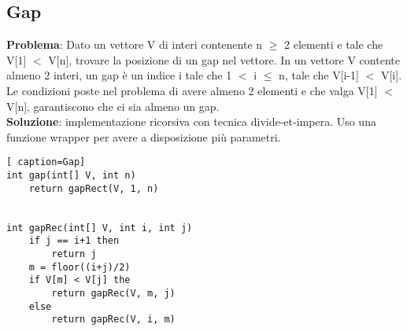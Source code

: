 \documentclass[../cheatSheetAlgoritmi.tex]{subfiles}
\begin{document}
\subsection{Gap}
\textbf{Problema}: Dato un vettore V di interi contenente n $\geq$ 2 elementi e tale che V[1] $<$ V[n], trovare la posizione di un gap nel vettore. In un vettore V contente almeno 2 interi, un gap è un indice i tale che 1 $<$ i $\leq$ n, tale che V[i-1] $<$ V[i]. Le condizioni poste nel problema di avere almeno 2 elementi e che valga V[1] $<$ V[n], garantiscono che ci sia almeno un gap.\\
\textbf{Soluzione}: implementazione ricorsiva con tecnica divide-et-impera. Uso una funzione wrapper per avere a disposizione più parametri.
\newpage
\begin{lstlisting}[ caption=Gap]
int gap(int[] V, int n)
	return gapRect(V, 1, n)
	

int gapRec(int[] V, int i, int j)
	if j == i+1 then
		return j
	m = floor((i+j)/2)
	if V[m] < V[j] the
		return gapRec(V, m, j)
	else 
		return gapRec(V, i, m)
\end{lstlisting}
\newpage
\end{document}
